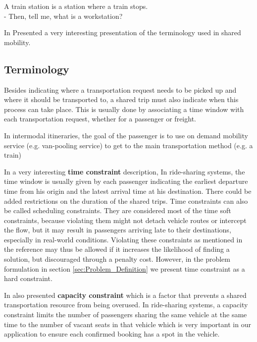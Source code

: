 \documentclass{article}
\begin{document}
\begin{flushright}
A train station is a station where a train stops.\\
- Then, tell me, what is a workstation?
\end{flushright}


In \cite{hyland_taxonomy} \cite{MOURAD2019}  \cite{Schnee2009} Presented a very interesting presentation of the terminology used in shared mobility.

\subsection{Terminology}

Besides indicating where a transportation request needs to be picked up and where it should be transported to, a shared trip must also indicate when this process can take place. 
This is usually done by associating a time window with each transportation request, whether for a passenger or freight. 

In intermodal itineraries, the goal of the passenger is to use on demand mobility service (e.g. van-pooling service) to get to the main transportation method (e.g. a train) 


In  \cite{MOURAD2019} a very interesting \textbf{time constraint} description, In ride-sharing systems, the time window is usually given by each passenger indicating the earliest departure time from his origin and the latest arrival time at his destination.
There could be added restrictions on the duration of the shared trips. Time constraints can also be called scheduling constraints. They are considered most of the time soft constraints, because violating them might not detach vehicle routes or intercept the flow, but it may result in passengers arriving late to their destinations, especially in real-world conditions. Violating these
constraints as mentioned in the reference may thus be allowed if it increases the likelihood of finding a solution, but discouraged through
a penalty cost. However, in the problem formulation in section \ref{sec:Problem_Definition} we present time constraint as a hard constraint.

In \cite{MOURAD2019}  also presented  \textbf{capacity constraint} which is a factor that prevents a shared transportation resource from being overused. In ride-sharing systems, a capacity constraint limits the number of passengers sharing the same vehicle at the
same time to the number of vacant seats in that vehicle which is very important in our application to ensure each confirmed booking has a spot in the vehicle.
\end{document}
